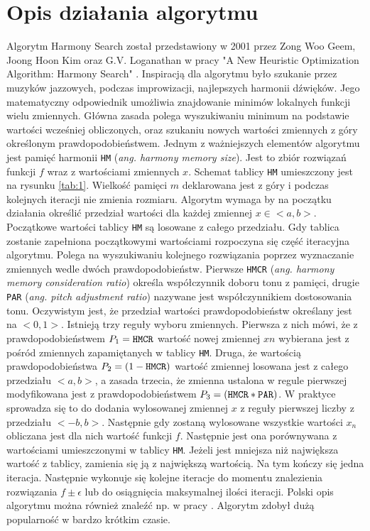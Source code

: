 \documentclass[10pt, a4paper]{article}
\begin{document}
\section{Opis działania algorytmu}
\label{sec:opis}
Algorytm Harmony Search został przedstawiony w 2001 przez Zong Woo Geem, Joong Hoon Kim oraz G.V. Loganathan w pracy "A New Heuristic Optimization Algorithm: Harmony Search" \cite{bib:orginal}. Inspiracją dla algorytmu było szukanie przez muzyków jazzowych, podczas improwizacji, najlepszych harmonii dźwięków. Jego matematyczny odpowiednik umożliwia znajdowanie minimów lokalnych funkcji wielu zmiennych. Główna zasada polega wyszukiwaniu minimum na podstawie wartości wcześniej obliczonych, oraz szukaniu nowych wartości zmiennych z góry określonym prawdopodobieństwem. Jednym z ważniejszych elementów algorytmu jest pamięć harmonii {\tt HM} ({\em ang. harmony memory size}). Jest to zbiór rozwiązań funkcji $f$ wraz z wartościami zmiennych $x$. Schemat tablicy {\tt HM} umieszczony jest na rysunku \ref{tab:1}. Wielkość pamięci $m$ deklarowana jest z góry i podczas kolejnych iteracji nie zmienia rozmiaru. Algorytm wymaga by na początku działania określić przedział wartości dla każdej zmiennej $x \in <a,b>$. Początkowe wartości tablicy {\tt HM} są losowane z całego przedziału. Gdy tablica zostanie zapełniona początkowymi wartościami rozpoczyna się część iteracyjna algorytmu. Polega na wyszukiwaniu kolejnego rozwiązania poprzez wyznaczanie zmiennych wedle dwóch prawdopodobieństw. Pierwsze {\tt HMCR} ({\em ang. harmony memory consideration ratio}) określa współczynnik doboru tonu z pamięci, drugie {\tt PAR} ({\em ang. pitch adjustment ratio}) nazywane jest współczynnikiem dostosowania tonu. Oczywistym jest, że przedział wartości prawdopodobieństw określany jest na $<0,1>$. Istnieją trzy reguły wyboru zmiennych. Pierwsza z nich mówi, że z prawdopodobieństwem $P_{1}={\tt HMCR}$ wartość nowej zmiennej $x{n}$ wybierana jest z pośród zmiennych zapamiętanych w tablicy {\tt HM}. Druga, że wartością prawdopodobieństwa $P_{2}=(1-{\tt HMCR})$ wartość zmiennej losowana jest z całego przedziału $<a,b>$, a zasada trzecia, że zmienna ustalona w regule pierwszej modyfikowana jest z prawdopodobieństwem $P_{3}=({\tt HMCR}*{\tt PAR})$. W praktyce sprowadza się to do dodania wylosowanej zmiennej $x$ z reguły pierwszej liczby z przedziału $<-b,b>$. Następnie gdy zostaną wylosowane wszystkie wartości $x_{n}$ obliczana jest dla nich wartość funkcji $f$. Następnie jest ona porównywana z wartościami umieszczonymi w tablicy {\tt HM}. Jeżeli jest mniejsza niż największa wartość z tablicy, zamienia się ją z największą wartością. Na tym kończy się jedna iteracja. Następnie wykonuje się kolejne iteracje do momentu znalezienia rozwiązania $f\pm \epsilon$ lub do osiągnięcia maksymalnej ilości iteracji. Polski opis algorytmu można również znaleźć np. w pracy \cite{bib:tlumaczenie}. Algorytm zdobył dużą popularność w bardzo krótkim czasie.
\end{document}
